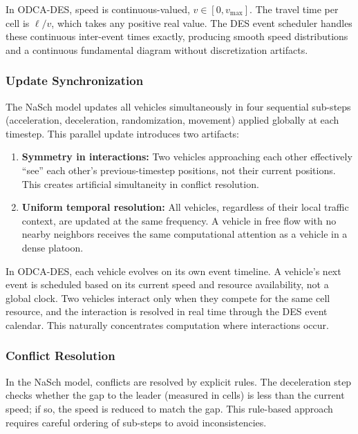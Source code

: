 \documentclass[review,authoryear]{elsarticle}
\begin{document}
In ODCA-DES, speed is continuous-valued, $v \in [0, v_{\max}]$. The travel time per cell is $\ell/v$, which takes any positive real value. The DES event scheduler handles these continuous inter-event times exactly, producing smooth speed distributions and a continuous fundamental diagram without discretization artifacts.

\subsubsection{Update Synchronization}

The NaSch model updates all vehicles simultaneously in four sequential sub-steps (acceleration, deceleration, randomization, movement) applied globally at each timestep. This parallel update introduces two artifacts:
\begin{enumerate}
    \item \textbf{Symmetry in interactions:} Two vehicles approaching each other effectively ``see'' each other's previous-timestep positions, not their current positions. This creates artificial simultaneity in conflict resolution.
    \item \textbf{Uniform temporal resolution:} All vehicles, regardless of their local traffic context, are updated at the same frequency. A vehicle in free flow with no nearby neighbors receives the same computational attention as a vehicle in a dense platoon.
\end{enumerate}

In ODCA-DES, each vehicle evolves on its own event timeline. A vehicle's next event is scheduled based on its current speed and resource availability, not a global clock. Two vehicles interact only when they compete for the same cell resource, and the interaction is resolved in real time through the DES event calendar. This naturally concentrates computation where interactions occur.

\subsubsection{Conflict Resolution}

In the NaSch model, conflicts are resolved by explicit rules. The deceleration step checks whether the gap to the leader (measured in cells) is less than the current speed; if so, the speed is reduced to match the gap. This rule-based approach requires careful ordering of sub-steps to avoid inconsistencies.
\end{document}
